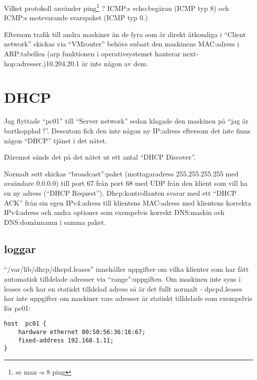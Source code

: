 \documentclass[11pt,a4paper]{article}
\begin{document}
Vilket protokoll använder ping\footnote{se man -s 8 ping} ? ICMP:s echo:begäran (ICMP typ 8) och ICMP:s motsvarande svarspaket (ICMP typ 0.)

Eftersom trafik till andra maskiner än de fyra som är direkt åtkomliga i ``Client network'' skickas via
 ``VMrouter'' behövs enbart den maskinens MAC:adress i ARP:tabellen (arp funktionen i operativsystemet hanterar
next-hop:adresser.)\@10.204.20.1 är inte någon av dem.

\section{DHCP}
\label{sec:dhcp_konf}

Jag flyttade ``pc01'' till  ``Server network'' sedan klagade den maskinen på ``jag är bortkopplad !''.
Dessutom fick den inte någon ny IP:adress eftersom det inte finns någon ``DHCP'' tjänst i det nätet.

Däremot sänds det på det nätet ut ett antal ``DHCP Discover''.

Normalt sett skickas ``broadcast'':paket (mottagaradress 255.255.255.255 med avsändare 0.0.0.0) till port 67 från port 68 med UDP från
den klient som vill ha en ny adress (``DHCP Request''). Dhcp:kontrollanten svarar med ett ``DHCP ACK'' från sin
egen IPv4:adress till klientens MAC-adress med klientens korrekta IPv4:adress och andra optioner som exempelvis
korrekt DNS:maskin och DNS:domännamn i samma paket.

\newpage

\subsection{loggar}

``/var/lib/dhcp/dhcpd.leases'' innehåller uppgifter om vilka klienter som har fått
automatisk tilldelade adresser via ``range'':uppgiften. Om maskinen inte syns i leases och
har en statiskt tilldelad adress så är det fullt normalt - dpcpd.leases har inte
uppgifter om maskiner vars adresser är statiskt tilldelade
som exempelvis för pc01:


\begin{lstlisting}[caption={/etc/dhcp/dhcpd.conf}]
host  pc01 {
    hardware ethernet 00:50:56:36:16:67;
    fixed-address 192.168.1.11;
}
\end{lstlisting}
\end{document}
